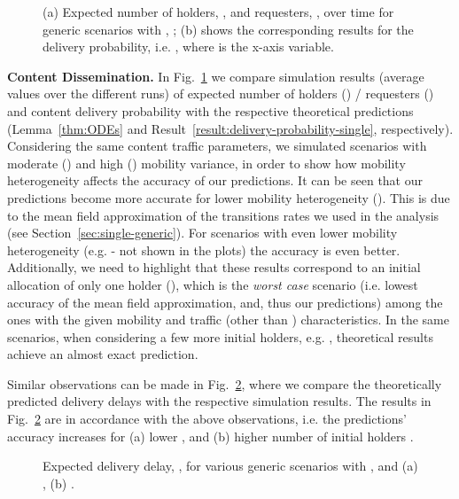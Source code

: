 \documentclass[10pt,conference,letterpaper]{IEEEtran}
\begin{document}
\begin{figure}
\caption{(a) Expected number of holders, , and requesters, , over time for generic scenarios with , ; (b) shows the corresponding results for the delivery probability, i.e. , where  is the x-axis variable.}
\label{fig:synthetic-H(t)-Prob}
\end{figure}

\textbf{Content Dissemination.} In Fig.~\ref{fig:synthetic-H(t)-Prob} we compare simulation results (average values over the different runs) of expected number of holders () / requesters () and content delivery probability  with the respective theoretical predictions (Lemma~\ref{thm:ODEs} and Result~\ref{result:delivery-probability-single}, respectively). Considering the same content traffic parameters, we simulated scenarios with moderate () and high () mobility variance, in order to show how mobility heterogeneity affects the accuracy of our predictions. It can be seen that our predictions become more accurate for lower mobility heterogeneity (). This is due to the mean field approximation of the transitions rates we used in the analysis (see Section~\ref{sec:single-generic}). For scenarios with even lower mobility heterogeneity (e.g.  - not shown in the plots) the accuracy is even better. Additionally, we need to highlight that these results correspond to an initial allocation of only one holder (), which is the \textit{worst case} scenario (i.e. lowest accuracy of the mean field approximation, and, thus our predictions) among the ones with the given mobility and traffic (other than ) characteristics. In the same scenarios, when considering a few more initial holders, e.g. , theoretical results achieve an almost exact prediction. 

Similar observations can be made in Fig.~\ref{fig:synthetic-Delay}, where we compare the theoretically predicted delivery delays with the respective simulation results. The results in Fig.~\ref{fig:synthetic-Delay} are in accordance with the above observations, i.e. the predictions' accuracy increases for (a) lower , and (b) higher number of initial holders .

\begin{figure}
\caption{Expected delivery delay, , for various generic scenarios with ,  and (a) , (b) .}
\label{fig:synthetic-Delay}
\end{figure}
\end{document}
